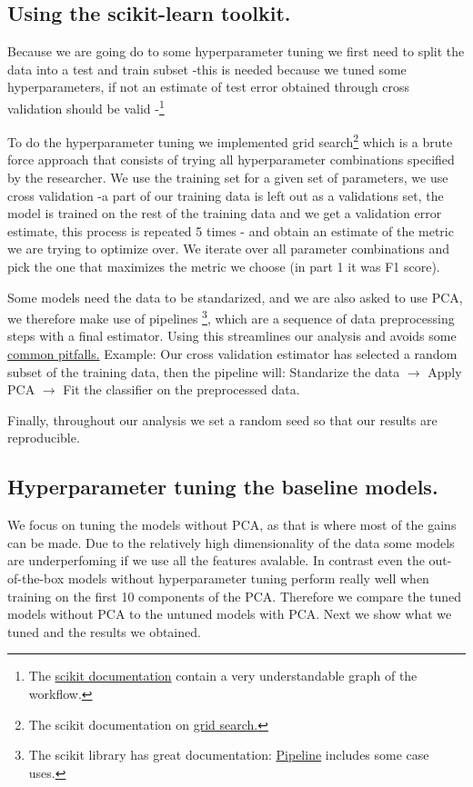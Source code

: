 \documentclass{article}
\begin{document}
\subsection{Using the scikit-learn toolkit.}
Because we are going do to some hyperparameter tuning we first need to split the data into a test and train subset -this is needed because we tuned some hyperparameters, if not an estimate of test error obtained through cross validation should be valid -\footnote{The \href{https://scikit-learn.org/1.5/modules/cross_validation.html}{scikit documentation} contain a very understandable graph of the workflow.}

To do the hyperparameter tuning we implemented grid search\footnote{The scikit documentation on \href{https://scikit-learn.org/1.5/modules/grid_search.html}{grid search.}
} which is a brute force approach that consists of trying all hyperparameter combinations specified by the researcher. 
We use the training set for a given set of parameters, we use cross validation -a part of our training data is left out as a validations set, the model is trained on the rest of the training data and we get a validation error estimate, this process is repeated 5 times - and obtain an estimate of the metric we are trying to optimize over.
We iterate over all parameter combinations and pick the one that maximizes the metric we choose (in part 1 it was F1 score).

Some models need the data to be standarized, and we are also asked to use PCA, we therefore make use of pipelines \footnote{The scikit library has great documentation:
\href{https://scikit-learn.org/stable/modules/generated/sklearn.pipeline.Pipeline.html}{Pipeline} includes some case uses.}, which are a sequence of data preprocessing steps with a final estimator. Using this 
streamlines our analysis and avoids some \href{https://scikit-learn.org/stable/common_pitfalls.html}{common pitfalls.}
Example: Our cross validation estimator has selected a random subset of the training data, then the pipeline will: Standarize the data $\rightarrow$ Apply PCA $\rightarrow$ Fit the classifier on the preprocessed data.

Finally, throughout our analysis we set a random seed so that our results are reproducible.

\subsection{Hyperparameter tuning the baseline models.}
We focus on tuning the models without PCA, as that is where most of the gains can be made. Due to the relatively high dimensionality of the
data some models are underperfoming if we use all the features avalable. In contrast even the out-of-the-box models without hyperparameter tuning 
perform really well when training on the first 10 components of the PCA. Therefore we compare the tuned models without PCA to the untuned models with PCA. 
Next we show what we tuned and the results we obtained.
\end{document}
